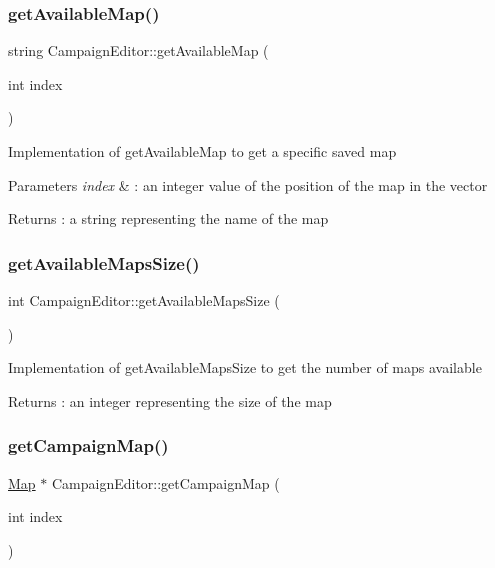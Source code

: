 \subsubsection{\texorpdfstring{get\+Available\+Map()}{getAvailableMap()}}
{\footnotesize\ttfamily string Campaign\+Editor\+::get\+Available\+Map (\begin{DoxyParamCaption}\item[{int}]{index }\end{DoxyParamCaption})}

Implementation of get\+Available\+Map to get a specific saved map 
\begin{DoxyParams}{Parameters}
{\em index} & \+: an integer value of the position of the map in the vector \\
\hline
\end{DoxyParams}
\begin{DoxyReturn}{Returns}
\+: a string representing the name of the map 
\end{DoxyReturn}
\hypertarget{class_campaign_editor_ae5046609eeca16a31392bcabcdb1db74}{}\label{class_campaign_editor_ae5046609eeca16a31392bcabcdb1db74} 
\subsubsection{\texorpdfstring{get\+Available\+Maps\+Size()}{getAvailableMapsSize()}}
{\footnotesize\ttfamily int Campaign\+Editor\+::get\+Available\+Maps\+Size (\begin{DoxyParamCaption}{ }\end{DoxyParamCaption})}

Implementation of get\+Available\+Maps\+Size to get the number of maps available \begin{DoxyReturn}{Returns}
\+: an integer representing the size of the map 
\end{DoxyReturn}
\hypertarget{class_campaign_editor_a4524f058b13cb5ab04a65a04c7694550}{}\label{class_campaign_editor_a4524f058b13cb5ab04a65a04c7694550} 
\subsubsection{\texorpdfstring{get\+Campaign\+Map()}{getCampaignMap()}}
{\footnotesize\ttfamily \hyperlink{class_map}{Map} $\ast$ Campaign\+Editor\+::get\+Campaign\+Map (\begin{DoxyParamCaption}\item[{int}]{index }\end{DoxyParamCaption})}

